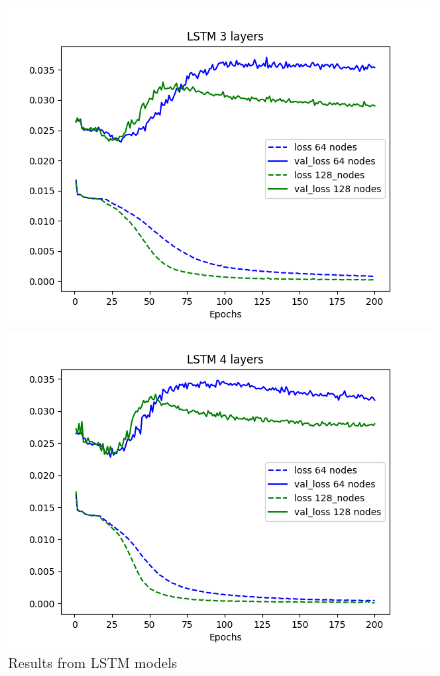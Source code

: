 \documentclass[11pt]
{article}
\begin{document}
\begin{figure}[H]
\begin{minipage}[b]{0.33\linewidth}
		\includegraphics[width=\linewidth]{../TESTS_RESULTS/LSTM_tests/plots/3_comp.png} 
	\end{minipage}%
	\begin{minipage}[b]{0.33\linewidth}
		\centering
		\includegraphics[width=\linewidth]{../TESTS_RESULTS/LSTM_tests/plots/4_comp.png} 
	\end{minipage} 
\caption{Results from LSTM models} 
\label{fig:LSTMplots}
\end{figure}
\end{document}
